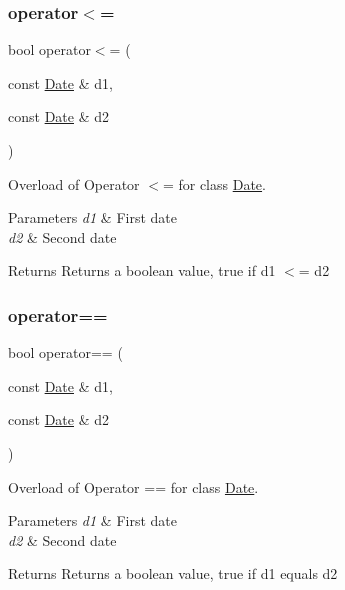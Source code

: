 \subsubsection{\texorpdfstring{operator$<$=}{operator<=}}
{\footnotesize\ttfamily bool operator$<$= (\begin{DoxyParamCaption}\item[{const \hyperlink{class_date}{Date} \&}]{d1,  }\item[{const \hyperlink{class_date}{Date} \&}]{d2 }\end{DoxyParamCaption})\hspace{0.3cm}{\ttfamily [friend]}}

Overload of Operator $<$= for class \hyperlink{class_date}{Date}. 
\begin{DoxyParams}{Parameters}
{\em d1} & First date \\
\hline
{\em d2} & Second date \\
\hline
\end{DoxyParams}
\begin{DoxyReturn}{Returns}
Returns a boolean value, true if d1 $<$= d2 
\end{DoxyReturn}
\mbox{\label{class_date_a18dc8aca1ca4d8cadc2b464db984135b}} 
\subsubsection{\texorpdfstring{operator==}{operator==}}
{\footnotesize\ttfamily bool operator== (\begin{DoxyParamCaption}\item[{const \hyperlink{class_date}{Date} \&}]{d1,  }\item[{const \hyperlink{class_date}{Date} \&}]{d2 }\end{DoxyParamCaption})\hspace{0.3cm}{\ttfamily [friend]}}

Overload of Operator == for class \hyperlink{class_date}{Date}. 
\begin{DoxyParams}{Parameters}
{\em d1} & First date \\
\hline
{\em d2} & Second date \\
\hline
\end{DoxyParams}
\begin{DoxyReturn}{Returns}
Returns a boolean value, true if d1 equals d2 
\end{DoxyReturn}
\mbox{\label{class_date_a5b292605462c1f43c993c0b2f5592cdc}} 
